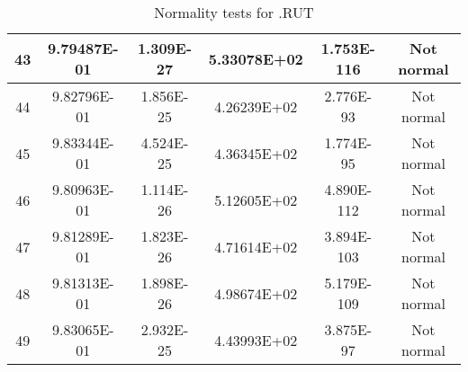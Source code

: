 \begin{table}[h]
\begin{tabular}{|c|c|c|c|c|c|}
		43 & 9.79487E-01 & 1.309E-27 & 5.33078E+02 & 1.753E-116 & Not normal\\\hline
		44 & 9.82796E-01 & 1.856E-25 & 4.26239E+02 & 2.776E-93 & Not normal\\\hline
		45 & 9.83344E-01 & 4.524E-25 & 4.36345E+02 & 1.774E-95 & Not normal\\\hline
		46 & 9.80963E-01 & 1.114E-26 & 5.12605E+02 & 4.890E-112 & Not normal\\\hline
		47 & 9.81289E-01 & 1.823E-26 & 4.71614E+02 & 3.894E-103 & Not normal\\\hline
		48 & 9.81313E-01 & 1.898E-26 & 4.98674E+02 & 5.179E-109 & Not normal\\\hline
		49 & 9.83065E-01 & 2.932E-25 & 4.43993E+02 & 3.875E-97 & Not normal\\\hline
	\end{tabular}
	\caption{Normality tests for .RUT}
\end{table}

